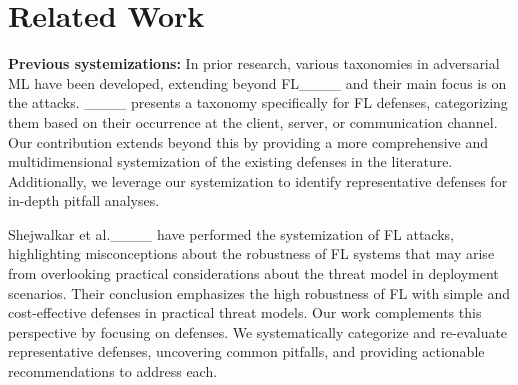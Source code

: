 \section{Related Work}
\label{sec:related}
\noindent\textbf{Previous systemizations: }
In prior research, various taxonomies
in adversarial ML have been developed, extending beyond
FL____ and their main focus is on the attacks.
____  presents a taxonomy specifically for FL defenses, categorizing them based on their occurrence at the client, server, or communication channel. Our contribution extends beyond this by providing a more comprehensive and multidimensional systemization of the existing defenses in the literature. Additionally, we leverage our systemization to identify representative defenses for in-depth pitfall analyses.


Shejwalkar et al.____ have performed the systemization of FL attacks, highlighting misconceptions about the robustness of FL systems that may arise from overlooking practical considerations about the threat model in deployment scenarios. Their conclusion emphasizes the high robustness of FL with simple and cost-effective defenses in practical threat models. Our work complements this perspective by focusing on defenses. We systematically categorize and re-evaluate representative defenses, uncovering common pitfalls, and providing actionable recommendations to address each.

